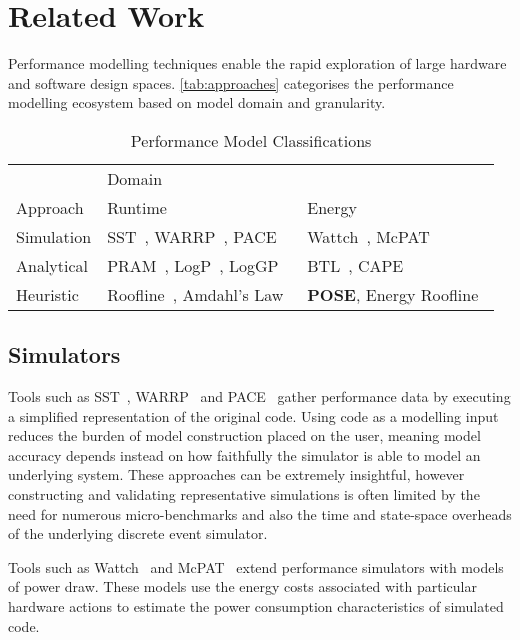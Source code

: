 \section{Related Work}
\label{sec:related}
\noindent
Performance modelling techniques enable the rapid exploration of large hardware and software design spaces.
\autoref{tab:approaches} categorises the performance modelling ecosystem based on model domain and granularity.

\begin{table}
  \centering
  \scriptsize
  \setlength{\tabcolsep}{.7em} 
  \caption{Performance Model Classifications}
  \begin{tabular}{lll}
  \toprule
    & \multicolumn{2}{l}{Domain}\\ \cmidrule(){2-3}
    Approach & Runtime & Energy \\
    \midrule
  Simulation & SST~\cite{rodrigues:2011aa}, WARRP~\cite{hammond:2009aa}, PACE~\cite{cao:2000aa} & Wattch~\cite{brooks:2000aa}, McPAT~\cite{li:2009aa}  \\
  Analytical & PRAM~\cite{karp:1991aa}, LogP~\cite{culler:1993aa}, LogGP~\cite{alexandrov:1997aa} & BTL~\cite{manousakis:2012aa}, CAPE~\cite{kamble:1997aa} \\
  Heuristic & Roofline~\cite{williams:2009aa}, Amdahl's Law~\cite{amdahl:1967aa} & \textbf{POSE}, Energy Roofline~\cite{choi:2013aa} \\
  \bottomrule
  \end{tabular}
  \label{tab:approaches}
\end{table}

\noindent
\subsection{Simulators} 
Tools such as SST~\cite{rodrigues:2011aa}, WARRP~\cite{hammond:2009aa} and PACE~\cite{cao:2000aa} gather performance data by executing a simplified representation of the original code.
Using code as a modelling input reduces the burden of model construction placed on the user, meaning model accuracy depends instead on how faithfully the simulator is able to model an underlying system.
These approaches can be extremely insightful, however constructing and validating representative simulations is often limited by the need for numerous micro-benchmarks and also the time and state-space overheads of the underlying discrete event simulator.

Tools such as Wattch~\cite{brooks:2000aa} and McPAT~\cite{li:2009aa} extend performance simulators with models of power draw.
These models use the energy costs associated with particular hardware actions to estimate the power consumption characteristics of simulated code.

